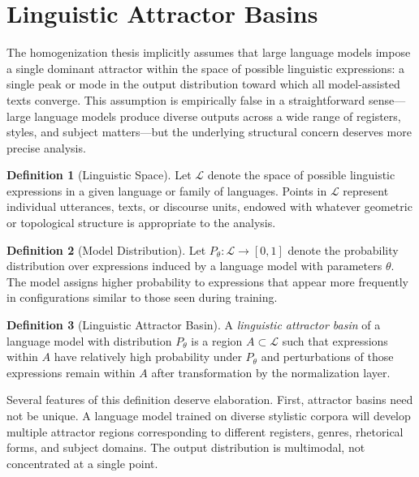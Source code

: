 \documentclass[12pt,a4paper]{article}
\theoremstyle{definition}
\newtheorem{definition}{Definition}[section]
\theoremstyle{plain}
\theoremstyle{remark}
\newcommand{\calL}{\mathcal{L}}
\begin{document}
\section{Linguistic Attractor Basins}
\label{sec:attractor}

The homogenization thesis implicitly assumes that large language models impose a single
dominant attractor within the space of possible linguistic expressions: a single peak or mode
in the output distribution toward which all model-assisted texts converge. This assumption is
empirically false in a straightforward sense---large language models produce diverse outputs
across a wide range of registers, styles, and subject matters---but the underlying structural
concern deserves more precise analysis.

\begin{definition}[Linguistic Space]
Let $\calL$ denote the space of possible linguistic expressions in a given language or family
of languages. Points in $\calL$ represent individual utterances, texts, or discourse units,
endowed with whatever geometric or topological structure is appropriate to the analysis.
\end{definition}

\begin{definition}[Model Distribution]
Let $P_\theta : \calL \to [0,1]$ denote the probability distribution over expressions induced
by a language model with parameters $\theta$. The model assigns higher probability to
expressions that appear more frequently in configurations similar to those seen during
training.
\end{definition}

\begin{definition}[Linguistic Attractor Basin]
A \emph{linguistic attractor basin} of a language model with distribution $P_\theta$ is a
region $A \subset \calL$ such that expressions within $A$ have relatively high probability
under $P_\theta$ and perturbations of those expressions remain within $A$ after transformation
by the normalization layer.
\end{definition}

Several features of this definition deserve elaboration. First, attractor basins need not be
unique. A language model trained on diverse stylistic corpora will develop multiple attractor
regions corresponding to different registers, genres, rhetorical forms, and subject domains.
The output distribution is multimodal, not concentrated at a single point.
\end{document}
